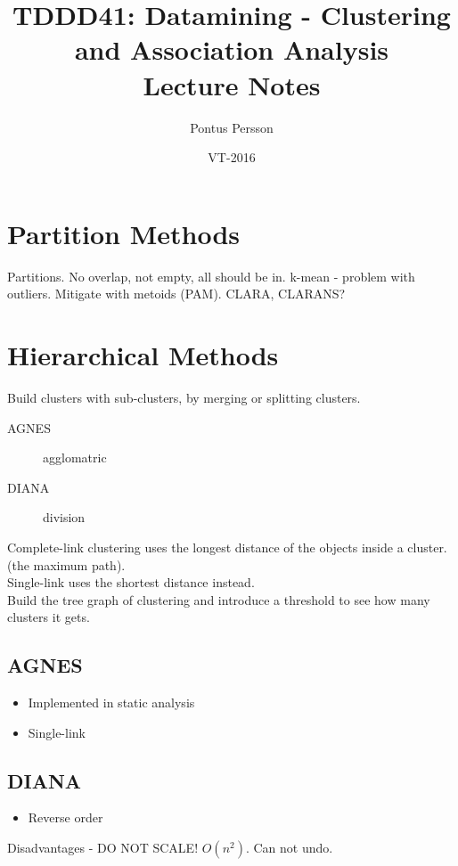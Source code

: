\documentclass[a4paper]{article}
\title{TDDD41: Datamining - Clustering and Association Analysis\\Lecture Notes}
\author{Pontus Persson}
\date{VT-2016}
\begin{document}
\maketitle
\tableofcontents
\section{Partition Methods}
Partitions.
No overlap, not empty, all should be in.
k-mean - problem with outliers. Mitigate with metoids (PAM). CLARA, CLARANS?
\section{Hierarchical Methods}
Build clusters with sub-clusters, by merging or splitting clusters.
\begin{description}
	\item[AGNES] agglomatric
	\item[DIANA] division
\end{description}

Complete-link clustering uses the longest distance of the objects inside a
cluster. (the maximum path).\\
Single-link uses the shortest distance instead.\\
Build the tree graph of clustering and introduce a threshold to see how many
clusters it gets.
\subsection{AGNES}
\begin{itemize}
	\item Implemented in static analysis
	\item Single-link
\end{itemize}
\subsection{DIANA}
\begin{itemize}
	\item Reverse order
\end{itemize}
Disadvantages - DO NOT SCALE! $O(n^2)$. Can not undo.
\end{document}

